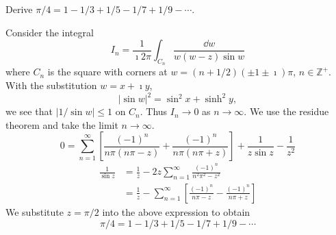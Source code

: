 \begin{Example}
  Derive $\pi/4 = 1 - 1/3 + 1/5 - 1/7 + 1/9 - \cdots$.

  Consider the integral
  \[ 
  I_n = \frac{1}{\imath 2 \pi} \int_{C_n} \frac{\dd w}{w(w-z) \sin w} 
  \]
  where $C_n$ is the square with corners at $w = (n + 1/2)(\pm 1 \pm \imath) \pi$,
  $n \in \mathbb{Z}^+$.  With the substitution $w = x + \imath y$,
  \[ 
  |\sin w|^2 = \sin^2 x + \sinh^2 y,
  \]
  we see that $|1/ \sin w| \leq 1$ on $C_n$.  Thus $I_n \to 0$ as
  $n \to \infty$.  We use the residue theorem and take the limit $n \to \infty$.
  \[
  0 = \sum_{n=1}^\infty \left[ \frac{(-1)^n}{n\pi(n\pi-z)}
    +\frac{(-1)^n}{n\pi(n\pi+z)} \right] + \frac{1}{z \sin z} -
  \frac{1}{z^2}
  \]
  \begin{align*}
    \frac{1}{\sin z} &= \frac{1}{z} -
    2z \sum_{n=1}^\infty \frac{(-1)^n}{n^2 \pi^2 - z^2} \\
    &= \frac{1}{z} - \sum_{n=1}^\infty
    \left[ \frac{(-1)^n}{n\pi-z} - \frac{(-1)^n}{n\pi+z} \right]
  \end{align*}
  We substitute $z = \pi/2$ into the above expression to obtain
  \[
  \pi/4 = 1 - 1/3 + 1/5 - 1/7 + 1/9 - \cdots
  \]
\end{Example}





























